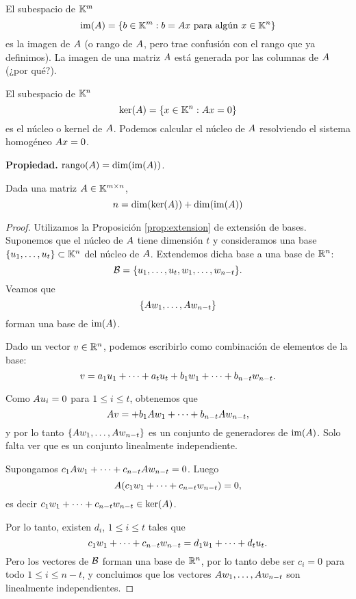 \begin{definicion}
El subespacio de $\mathbb K^m$
$$
\im(A) =\{\bb \in \K^m : \bb = \Ab \xb \text{ para algún } \xb \in \K^n\}
$$
es la imagen de $\Ab$ (o rango de $\Ab$, pero trae confusión con el rango que ya definimos). La imagen de una matriz $\Ab$ está generada por las columnas de $\Ab$ (¿por qué?).

El subespacio de $\mathbb K^n$
$$
\ker(\Ab)=\{\xb \in \K^n: \Ab\xb = 0\}
$$
es el núcleo o kernel de $\Ab$. Podemos calcular el núcleo de $\Ab$ resolviendo el sistema homogéneo $\Ab\xb = 0$.
\end{definicion}



\textbf{Propiedad.} $\rank(\Ab) = \dim(\im(\Ab))$.

\begin{teorema} Dada una matriz $\Ab \in \K^{m \times n}$,
$$
n = \dim(\ker(\Ab)) + \dim(\im(\Ab))
$$
\end{teorema}

\begin{proof}
Utilizamos la Proposición \ref{prop:extension} de extensión de bases. Suponemos que el núcleo de $\Ab$ tiene dimensión $t$ y consideramos una base $\{\ub_1, \dots, \ub_t\} \subset \K^n$ del núcleo de $\Ab$. Extendemos dicha base a una base de $\mathbb R^n$:
$$
\B = \{\ub_1, \dots, \ub_t, \wb_1, \dots, \wb_{n-t}\}.
$$
Veamos que
$$
\{\Ab \wb_1, \dots, \Ab \wb_{n-t}\}
$$
forman una base de $\operatorname{im}(A)$.

Dado un vector $v \in \mathbb R^n$, podemos escribirlo como combinación de elementos de la base:
$$
v = a_1 \ub_1 + \dots +a_t \ub_t  + b_1 \wb_1 + \dots + b_{n-t} \wb_{n-t}.
$$

Como $\Ab \ub_i = \cero$ para $1 \le i \le t$, obtenemos que
$$
\Ab\vb = + b_1 \Ab \wb_1 + \dots + b_{n-t} \Ab\wb_{n-t},
$$
y por lo tanto $\{\Ab \wb_1, \dots, \Ab \wb_{n-t}\}$ es un conjunto de generadores de $\operatorname{im}(A)$. Solo falta ver que es un conjunto linealmente independiente.

Supongamos $c_1 \Ab \wb_1 + \dots + c_{n-t} \Ab \wb_{n-t} = 0$. Luego
$$
\Ab (c_1 \wb_1 + \dots + c_{n-t} \wb_{n-t}) = 0,
$$
es decir $c_1 \wb_1 + \dots + c_{n-t} \wb_{n-t} \in \ker(A)$.

Por lo tanto, existen $d_i$, $1 \le i \le t$ tales que
$$
c_1 \wb_1 + \dots + c_{n-t} \wb_{n-t} = d_1 \ub_1  + \dots + d_t \ub_t.
$$
Pero los vectores de $\mathcal B$ forman una base de $\mathbb R^n$, por lo tanto debe ser $c_i=0$ para todo $1 \le i \le n-t$, y concluimos que los vectores $\Ab \wb_1, \dots, \Ab \wb_{n-t}$ son linealmente independientes.
\end{proof}


